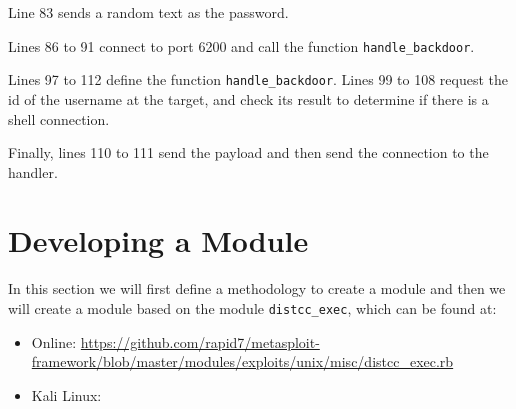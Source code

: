 \begin{listingbox}
    
\end{listingbox}

Line 83 sends a random text as the password.

\begin{listingbox}
    
\end{listingbox}

Lines 86 to 91 connect to port 6200 and call the function \texttt{handle\_backdoor}.

\begin{listingbox}
    
\end{listingbox}

Lines 97 to 112 define the function \texttt{handle\_backdoor}. Lines 99 to 108 request the id of the username at the target, and check its result to determine if there is a shell connection.

\begin{listingbox}
    
\end{listingbox}

Finally, lines 110 to 111 send the payload and then send the connection to the handler.

\begin{listingbox}
    
\end{listingbox}

\section{Developing a Module}

In this section we will first define a methodology to create a module and then we will create a module based on the module \texttt{distcc\_exec}, which can be found at: 

\begin{itemize}
    \item Online: \url{https://github.com/rapid7/metasploit-framework/blob/master/modules/exploits/unix/misc/distcc\_exec.rb}
    \item Kali Linux: 
\end{itemize}

